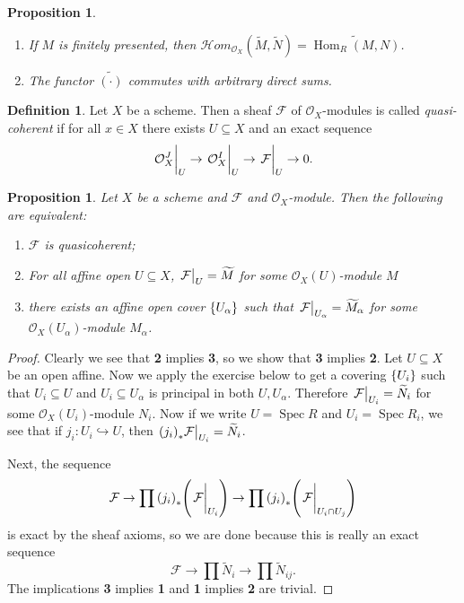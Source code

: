 \documentclass[leqno, openany]{memoir}
\newtheorem{prop}[thm]{Proposition}
\theoremstyle{definition}
\newtheorem{defn}[thm]{Definition}
\theoremstyle{remark}
\theoremstyle{plain}
\theoremstyle{definition}
\theoremstyle{remark}
\newcommand{\mc}[1]{\mathcal{#1}}
\newcommand{\wt}[1]{\widetilde{#1}}
\DeclareMathOperator{\Hom}{Hom}
\DeclareMathOperator{\Spec}{Spec}
\begin{document}
\begin{prop}\leavevmode \begin{enumerate} \item If $M$ is finitely presented,
then $\mc{H}om_{\mc{O}_X}(\wt{M}, \wt{N}) = \wt{\Hom_R(M, N)}$.  \item The
functor $\wt{(\cdot )}$ commutes with arbitrary direct sums.  \end{enumerate}
\end{prop}

\begin{defn} Let $X$ be a scheme. Then a sheaf $\mc{F}$ of $\mc{O}_X$-modules
    is called \textit{quasi-coherent} if for all $x \in X$ there exists $U
    \subseteq X$ and an exact sequence \[ \eval{\mc{O}_X^J}_U \to
    \eval{\mc{O}_X^I}_U \to \eval{\mc{F}}_U \to 0. \] \end{defn}

\begin{prop} Let $X$ be a scheme and $\mc{F}$ and $\mc{O}_X$-module. Then the
    following are equivalent: \begin{enumerate} \item $\mc{F}$ is
        quasicoherent; \item For all affine open $U \subseteq X$,
        $\eval{\mc{F}}_U = \wt{M}$ for some $\mc{O}_X(U)$-module $M$ \item
there exists an affine open cover $\qty{U_{\alpha}}$ such that
$\eval{\mc{F}}_{U_{\alpha}} = \wt{M}_{\alpha}$ for some
$\mc{O}_X(U_{\alpha})$-module $M_{\alpha}$.  \end{enumerate} \end{prop}

\begin{proof} Clearly we see that \textbf{2} implies \textbf{3}, so we show
    that \textbf{3} implies \textbf{2}. Let $U \subseteq X$ be an open affine.
    Now we apply the exercise below to get a covering $\qty{U_i}$ such that
    $U_i \subseteq U$ and $U_i \subseteq U_{\alpha}$ is principal in both $U,
    U_{\alpha}$. Therefore $\eval{\mc{F}}_{U_i} = \wt{N}_i$ for some
    $\mc{O}_X(U_i)$-module $N_i$. Now if we write $U = \Spec R$ and $U_i =
    \Spec R_i$, we see that if $j_i \colon U_i \hookrightarrow U$, then $\eval{
    {(j_i)}_* \mc{F} }_{U_i} = \wt{N}_i$.

    Next, the sequence \[ \mc{F} \to \prod {(j_i)}_* \qty(\eval{\mc{F}}_{U_i})
        \to \prod {(j_i)}_* \qty(\eval{\mc{F}}_{U_i \cap U_j}) \] is exact by
        the sheaf axioms, so we are done because this is really an exact
        sequence \[ \mc{F} \to \prod \wt{N}_i \to \prod \wt{N}_{ij}. \] The
    implications \textbf{3} implies \textbf{1} and \textbf{1} implies
\textbf{2} are trivial.  \end{proof}
\end{document}
